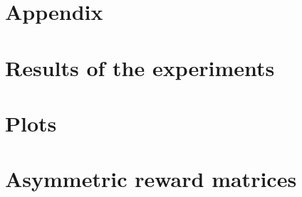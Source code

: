 \documentclass[twoside,11pt]{article}
\begin{document}
\renewcommand{\appendixpagename}{}
\begin{appendices}
  \section*{Appendix}

  \section{Results of the experiments}

  

  \newpage

  \section{Plots}

  \newpage

  \section{Asymmetric reward matrices}
  \label{sec:asym_rew_mat}

  \setcounter{MaxMatrixCols}{11}


\end{appendices}
\end{document}
